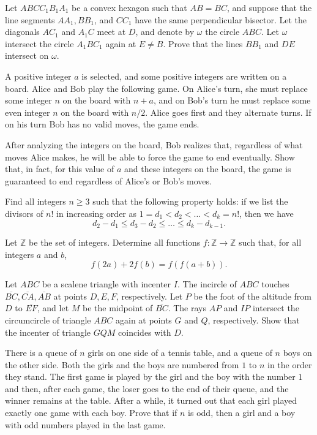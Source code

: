 \documentclass[11pt]{scrartcl}
\begin{document}
\begin{problem}[876239022447910]
	Let $ABCC_1B_1A_1$ be a convex hexagon such that $AB=BC$, and suppose that the line segments $AA_1, BB_1$, and $CC_1$ have the same perpendicular bisector. Let the diagonals $AC_1$ and $A_1C$ meet at $D$, and denote by $\omega$ the circle $ABC$. Let $\omega$ intersect the circle $A_1BC_1$ again at $E \neq B$. Prove that the lines $BB_1$ and $DE$ intersect on $\omega$.
\end{problem}
\begin{problem}[1473691226426629581]
A positive integer $a$ is selected, and some positive integers are written on a board. Alice and Bob play the following game. On Alice's turn, she must replace some integer $n$ on the board with $n+a$, and on Bob's turn he must replace some even integer $n$ on the board with $n/2$. Alice goes first and they alternate turns. If on his turn Bob has no valid moves, the game ends.

After analyzing the integers on the board, Bob realizes that, regardless of what moves Alice makes, he will be able to force the game to end eventually. Show that, in fact, for this value of $a$ and these integers on the board, the game is guaranteed to end regardless of Alice's or Bob's moves.
\end{problem}
\begin{problem}[4298196647118074747]
	Find all integers $n \geq 3$ such that the following property holds: if we list the divisors of $n!$ in increasing order as $1 = d_1 < d_2 < \dots < d_k = n!$, then we have
\[ d_2 - d_1 \leq d_3 - d_2 \leq \dots \leq d_k - d_{k-1}. \]
\end{problem}
\begin{problem}[684265043263216]
Let $\mathbb{Z}$ be the set of integers. Determine all functions $f: \mathbb{Z} \rightarrow \mathbb{Z}$ such that, for all integers $a$ and $b$,$$f(2a)+2f(b)=f(f(a+b)).$$
\end{problem}
\begin{problem}[6322745101407512634]
Let $ABC$ be a scalene triangle with incenter $I$. The incircle of $ABC$ touches $\overline{BC},\overline{CA},\overline{AB}$ at points $D,E,F$, respectively. Let $P$ be the foot of the altitude from $D$ to $\overline{EF}$, and let $M$ be the midpoint of $\overline{BC}$. The rays $AP$ and $IP$ intersect the circumcircle of triangle $ABC$ again at points $G$ and $Q$, respectively. Show that the incenter of triangle $GQM$ coincides with $D$.
\end{problem}
\begin{problem}[259897104343709]
	There is a queue of $n{}$ girls on one side of a tennis table, and a queue of $n{}$ boys on the other side. Both the girls and the boys are numbered from $1{}$ to $n{}$ in the order they stand. The first game is played by the girl and the boy with the number $1{}$ and then, after each game, the loser goes to the end of their queue, and the winner remains at the table. After a while, it turned out that each girl played exactly one game with each boy. Prove that if $n{}$ is odd, then a girl and a boy with odd numbers played in the last game.
\end{problem}
\end{document}
